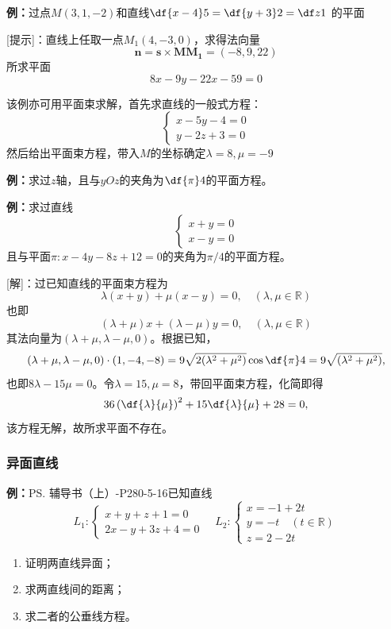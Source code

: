{\bf 例：}过点$M(3,1,-2)$和直线$\df{x-4}5=\df{y+3}2=\df z1$
的平面

[提示]：直线上任取一点$M_1(4,-3,0)$，求得法向量
$$\bm{n}=\bm{s}\times\bm{MM_1}=(-8,9,22)$$
所求平面
$$8x-9y-22x-59=0$$

该例亦可用平面束求解，首先求直线的一般式方程：
$$\left\{\begin{array}{l}x-5y-4=0\\ y-2z+3=0\end{array}\right.$$
然后给出平面束方程，带入$M$的坐标确定$\lambda=8,\mu=-9$

{\bf 例：}求过$z$轴，且与$yOz$的夹角为$\df{\pi}4$的平面方程。

{\bf 例：}求过直线
$$\left\{\begin{array}{l}
	x+y=0\\
	x-y=0
\end{array}\right.$$
且与平面$\pi:x-4y-8z+12=0$的夹角为$\pi/4$的平面方程。

[解]：过已知直线的平面束方程为
$$\lambda(x+y)+\mu(x-y)=0,\quad(\lambda,\mu\in\mathbb{R})$$
也即
$$(\lambda+\mu)x+(\lambda-\mu)y=0,\quad(\lambda,\mu\in\mathbb{R})$$
其法向量为$(\lambda+\mu,\lambda-\mu,0)$。根据已知，
$$(\lambda+\mu,\lambda-\mu,0)\cdot(1,-4,-8)
=9\sqrt{2(\lambda^2+\mu^2)}\cos\df{\pi}4=9\sqrt{(\lambda^2+\mu^2)},$$
也即$8\lambda-15\mu=0$。令$\lambda=15,\mu=8$，带回平面束方程，化简即得
$$36\left(\df{\lambda}{\mu}\right)^2+15\df{\lambda}{\mu}+28=0,$$
该方程无解，故所求平面不存在。\fin

\subsubsection{异面直线}

{\bf 例：}\ps{辅导书（上）-P280-5-16}已知直线
$$L_1:\left\{\begin{array}{l}
	x+y+z+1=0\\
	2x-y+3z+4=0
\end{array}\right.
\quad
L_2:\left\{\begin{array}{l}
	x=-1+2t\\
	y=-t\quad(t\in\mathbb{R})\\
	z=2-2t
\end{array}\right.
$$
\begin{enumerate}[(1)]
  \setlength{\itemindent}{1cm}
  \item 证明两直线异面；
  \item 求两直线间的距离；
  \item 求二者的公垂线方程。
\end{enumerate}

